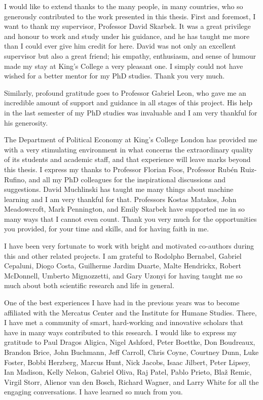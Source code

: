 \documentclass[a4paper,12pt]{report}
\begin{document}
I would like to extend thanks to the many people, in many countries, who so generously contributed to the work presented in this thesis. First and foremost, I want to thank my supervisor, Professor David Skarbek. It was a great privilege and honour to work and study under his guidance, and he has taught me more than I could ever give him credit for here. David was not only an excellent supervisor but also a great friend; his empathy, enthusiasm, and sense of humour made my stay at King's College a very pleasant one. I simply could not have wished for a better mentor for my PhD studies. Thank you very much.

Similarly, profound gratitude goes to Professor Gabriel Leon, who gave me an incredible amount of support and guidance in all stages of this project. His help in the last semester of my PhD studies was invaluable and I am very thankful for his generosity.

The Department of Political Economy at King's College London has provided me with a very stimulating environment in what concerns the extraordinary quality of its students and  academic staff, and that experience will leave marks beyond this thesis. I express my thanks to Professor Florian Foos, Professor Rubén Ruiz-Rufino, and all my PhD colleagues for the inspirational discussions and suggestions. David Muchlinski has taught me many things about machine learning and I am very thankful for that. Professors Kostas Matakos, John Meadowcroft, Mark Pennington, and Emily Skarbek have supported me in so many ways that I cannot even count. Thank you very much for the opportunities you provided, for your time and skills, and for having faith in me.

I have been very fortunate to work with bright and motivated co-authors during this and other related projects. I am grateful to Rodolpho Bernabel, Gabriel Cepaluni, Diogo Costa, Guilherme Jardim Duarte, Malte Hendrickx, Robert McDonnell, Umberto Mignozzetti, and Gary Uzonyi for having taught me so much about both scientific research and life in general.

One of the best experiences I have had in the previous years was to become affiliated with the Mercatus Center and the Institute for Humane Studies. There, I have met a community of smart, hard-working and innovative scholars that have in many ways contributed to this research. I would like to express my gratitude to Paul Dragos Aligica, Nigel Ashford, Peter Boettke, Don Boudreaux, Brandon Brice, John Buchmann, Jeff Carroll, Chris Coyne, Courtney Dunn, Luke Foster, Bobbi Herzberg, Marcus Hunt, Nick Jacobs, Isaac Jilbert, Peter Lipsey, Ian Madison, Kelly Nelson, Gabriel Oliva, Raj Patel, Pablo Prieto, Blaž Remic, Virgil Storr, Alienor van den Bosch, Richard Wagner, and Larry White for all the engaging conversations. I have learned so much from you.
\end{document}
